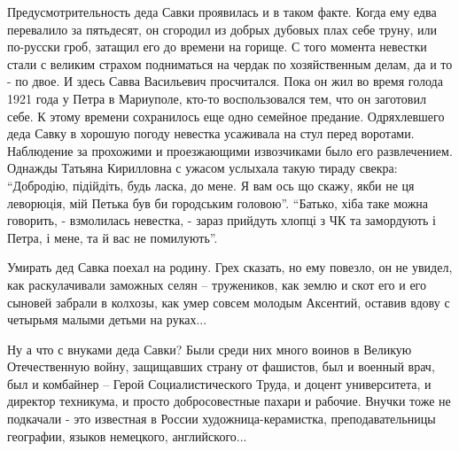 Предусмотрительность деда Савки проявилась и в таком факте. Когда ему едва
перевалило за пятьдесят, он сгородил из добрых дубовых плах себе  труну, или
по-русски гроб, затащил его до времени на горище. С того момента невестки стали
с великим страхом подниматься на чердак по хозяйственным делам, да и то - по
двое. И здесь Савва Васильевич просчитался. Пока он жил во время голода 1921
года у Петра в Мариуполе, кто-то воспользовался тем, что он заготовил себе. К
этому времени сохранилось еще одно семейное предание. Одряхлевшего деда Савку в
хорошую погоду невестка усаживала на стул перед воротами. Наблюдение за
прохожими и проезжающими извозчиками было его развлечением. Однажды Татьяна
Кирилловна  с ужасом услыхала такую тираду свекра: \enquote{Добродію, підійдіть, будь
ласка, до мене. Я вам ось що скажу, якби не ця леворюція, мій Петька був би
городським головою}. \enquote{Батько, хіба таке можна говорить, - взмолилась невестка,
- зараз прийдуть хлопці з ЧК та замордують і Петра, і мене, та й вас не
помилують}.

Умирать дед Савка поехал на родину. Грех сказать, но ему повезло, он не увидел,
как раскулачивали заможных селян – тружеников, как землю и скот его и его
сыновей забрали в колхозы, как умер совсем молодым Аксентий, оставив вдову с
четырьмя малыми детьми на руках...

Ну а что с внуками деда Савки? Были среди них много воинов в Великую
Отечественную войну, защищавших страну от фашистов, был и военный врач, был и
комбайнер – Герой Социалистического Труда, и доцент университета, и директор
техникума, и просто добросовестные пахари и рабочие. Внучки тоже не подкачали -
это известная в России художница-керамистка, преподавательницы географии,
языков немецкого, английского...
